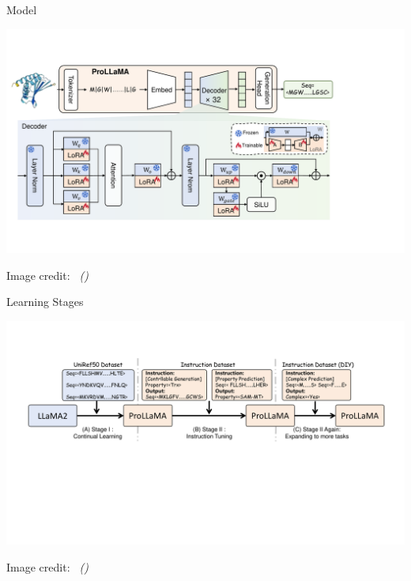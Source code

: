 \documentclass[dvipsnames,
hyperref={citecolor=blue}
]{beamer}
\newcommand{\credit}[2]{{\par\hfill \tiny #1 credit:~\itshape{\color{blue} \citeauthor{#2} (\citeyear{#2})}}}
\begin{document}
\begin{frame}{Model}
	\begin{center}
		\includegraphics[scale=0.44]{images/model.pdf}
	\end{center}
	\credit{Image}{lv2024prollama}
\end{frame}

\begin{frame}{Learning Stages}
	\begin{center}
		\includegraphics[scale=0.39]{images/training.pdf}
	\end{center}
	\credit{Image}{lv2024prollama}
\end{frame}
\end{document}
